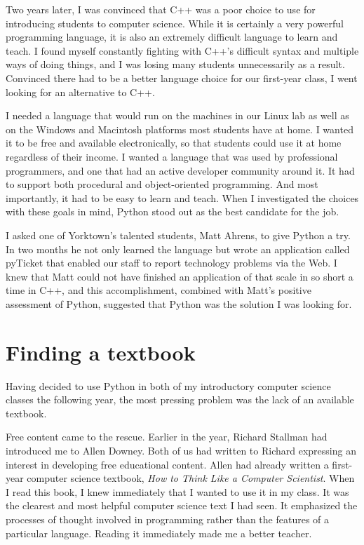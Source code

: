Two years later, I was convinced that C++ was a poor choice to use for
introducing students to computer science. While it is certainly a very
powerful programming language, it is also an extremely difficult
language to learn and teach.  I found myself constantly fighting with
C++'s difficult syntax and multiple ways of doing things, and I was
losing many students unnecessarily as a result. Convinced there had to
be a better language choice for our first-year class, I went looking
for an alternative to C++.

I needed a language that would run on the machines in our Linux lab as
well as on the Windows and Macintosh platforms most students have at
home.  I wanted it to be free and available electronically, so that
students could use it at home regardless of their income.  I wanted a
language that was used by professional programmers, and one that had
an active developer community around it.  It had to support both
procedural and object-oriented programming.  And most importantly, it
had to be easy to learn and teach.  When I investigated the choices
with these goals in mind, Python stood out as the best candidate for
the job.

I asked one of Yorktown's talented students, Matt Ahrens, 
to give Python a try.  In two months he not only learned the language
but wrote an application called pyTicket that enabled our staff to
report technology problems via the Web.  I knew that Matt could not
have finished an application of that scale in so short a time in C++,
and this accomplishment, combined with Matt's positive assessment of
Python, suggested that Python was the solution I was looking for.


\section*{Finding a textbook}

Having decided to use Python in both of my introductory computer
science classes the following year, the most pressing problem was the
lack of an available textbook.

Free content came to the rescue.  Earlier in the year, Richard
Stallman had introduced me to Allen Downey.  Both of us had written to
Richard expressing an interest in developing free educational
content.  Allen had already written a first-year computer science
textbook, {\em How to Think Like a Computer Scientist}.  When I read
this book, I knew immediately that I wanted to use it in my class.  It
was the clearest and most helpful computer science text I had seen.
It emphasized the processes of thought involved in programming rather
than the features of a particular language.  Reading it immediately
made me a better teacher.

